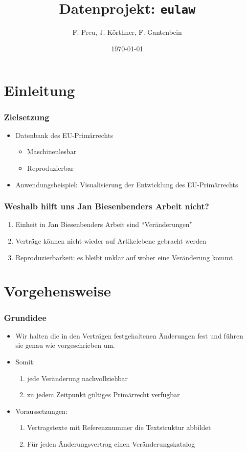 \documentclass[xcolor=dvipsnames]{beamer} %
\date{\today}
\title{Datenprojekt: \texttt{eulaw}}
\author{F. Preu, J. Körthner, F. Gantenbein}
\begin{document}
\frame{
\maketitle
}

\section{Einleitung}

\begin{frame}
  \frametitle{Zielsetzung}
  \begin{itemize}
  \item Datenbank des EU-Primärrechts
    \begin{itemize}
    \item Maschinenlesbar
    \item Reproduzierbar
    \end{itemize}
  \item Anwendungsbeispiel: Visualisierung der Entwicklung des EU-Primärrechts
  \end{itemize}
\end{frame}


\begin{frame}
  \frametitle{Weshalb hilft uns Jan Biesenbenders Arbeit nicht?}
  \begin{enumerate}
  \item Einheit in Jan Biesenbenders Arbeit sind \enquote{Veränderungen}
  \item Verträge können nicht wieder auf Artikelebene gebracht werden
  \item Reproduzierbarkeit: es bleibt unklar auf woher eine Veränderung kommt
  \end{enumerate}
\end{frame}

\section{Vorgehensweise}
\begin{frame}
  \frametitle{Grundidee}
  \begin{itemize}
  \item Wir halten die in den Verträgen festgehaltenen Änderungen fest und
   führen sie genau wie vorgeschrieben um. 
 \item Somit:
   \begin{enumerate}
   \item jede Veränderung nachvollziehbar
   \item zu jedem Zeitpunkt gültiges Primärrecht verfügbar
   \end{enumerate}
 \item Voraussetzungen:
   \begin{enumerate}
   \item Vertragstexte mit Referenznummer die Textstruktur abbildet
   \item Für jeden Änderungsvertrag einen Veränderungskatalog
   \end{enumerate}
  \end{itemize}
\end{frame}
\end{document}
